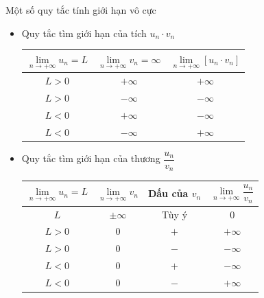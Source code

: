 \begin{dang}{Một số quy tắc tính giới hạn vô cực}
	\begin{itemize}
		\item [\ding{172}] Quy tắc tìm giới hạn của tích $u_n\cdot v_n$
		\begin{center}
			\begin{tabular}{|c|c|c|}
				\hline
				$\lim\limits_{n \to +\infty}u_n=L$ & $\lim\limits_{n \to +\infty}v_n = \infty$   & $\lim\limits_{n \to +\infty}\left[{u_n\cdot v_n}\right]$ \\
				\hline
				$L>0$   & $+\infty $   & $+\infty $ \\
				\hline
				$L>0$    & $-\infty $    & $-\infty $ \\
				\hline
				$L<0$   & $+\infty $   & $-\infty $ \\
				\hline
				$L<0$    & $-\infty $    & $+\infty $ \\
				\hline
			\end{tabular}
		\end{center}
		\item [\ding{173}]Quy tắc tìm giới hạn của thương $\dfrac{u_n}{v_n}$
		\begin{center}
			\begin{tabular}{|c|c|c|c|}
				\hline
				$\lim\limits_{n \to +\infty}u_n=L$ & $\lim\limits_{n \to +\infty}v_n$   & Dấu của $v_n$ & $\lim\limits_{n \to +\infty}\dfrac{u_n}{v_n}$\\
				\hline
				$L$   & $\pm \infty $   & Tùy ý & $0$\\
				\hline
				$L>0$   & $0$   & $+$ & $+\infty $\\
				\hline
				$L>0$    & $0$   & $-$ & $-\infty $\\
				\hline
				$L<0$   & $0$   & $+$ & $-\infty $\\
				\hline
				$L<0$    & $0$    & $-$ & $+\infty $\\
				\hline
			\end{tabular}
		\end{center}  
	\end{itemize}
	
\end{dang}



